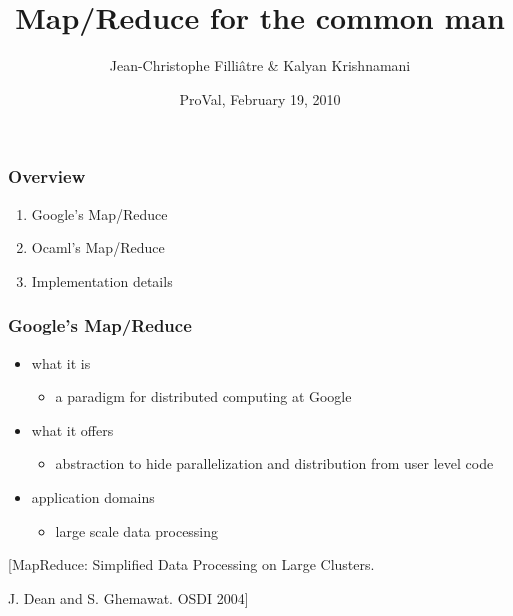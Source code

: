 \documentclass{beamer}
\begin{document}
\title{Map/Reduce for the common man}
\author[Jean-Christophe]{Jean-Christophe Filli\^atre \& Kalyan Krishnamani}
\date{ProVal, February 19, 2010}

\begin{frame}
  \titlepage
  \hfill
  \hfill
  \hfill
\end{frame}

\begin{frame}\frametitle{Overview}
  \begin{enumerate}
  \item Google's Map/Reduce
  \item Ocaml's Map/Reduce
  \item Implementation details
  \end{enumerate}
\end{frame}

\begin{frame}\frametitle{Google's Map/Reduce}
  \begin{itemize}
  \item 
    what it is
    \begin{itemize}
    \item a paradigm for distributed computing at Google
    \end{itemize}

    \bigskip
  \item 
    what it offers
    \begin{itemize}
    \item abstraction to hide parallelization and distribution from
      user level code
    \end{itemize}

    \bigskip
  \item 
    application domains
    \begin{itemize}
    \item large scale data processing
    \end{itemize}
  \end{itemize}

  \vfill
  [MapReduce: Simplified Data Processing on Large Clusters. \par
  J. Dean and S. Ghemawat. OSDI 2004]
\end{frame}
\end{document}
